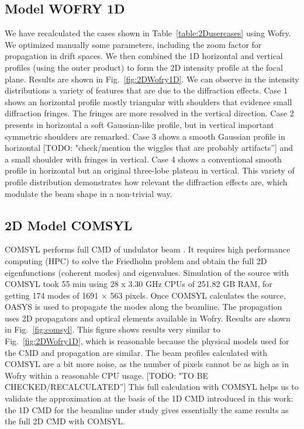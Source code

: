 \documentclass{iucr}              %
\newcommand{\todo}[1]{{\color{red}[TODO: "#1'']}}
\newcommand{\inred}[1]{{\color{red}#1}}
\begin{document}
\subsection{Model WOFRY 1D}
We have recalculated the cases shown in Table~\ref{table:2Dusercases} using Wofry. We optimized manually some parameters, including the zoom factor for propagation in drift spaces. We then combined the 1D horizontal and vertical profiles (using the outer product) to form the 2D intensity profile at the focal plane. Results are shown in Fig.~\ref{fig:2DWofry1D}. We can observe in the intensity distributions a variety of features that are due to the diffraction effects. Case 1 shows an horizontal profile mostly triangular with shoulders that evidence small diffraction fringes. The fringes are more resolved in the vertical direction. Case 2  presents in horizontal a soft Gaussian-like profile, but in vertical important symmetric shoulders are remarked. Case 3 shows a smooth Gaussian profile in horizontal \todo{check/mention the wiggles that are probably artifacts} and a small shoulder with fringes in vertical. Case 4 shows a conventional smooth profile in horizontal but an original three-lobe plateau in vertical. This variety of profile distribution demonstrates how relevant the diffraction effects are, which modulate the beam shape in a non-trivial way.  

\subsection{2D Model COMSYL}
COMSYL performs full CMD of undulator beam \cite{glass2017}. It requires high performance computing (HPC) to solve the Friedholm problem and obtain the full 2D eigenfunctions (coherent modes) and eigenvalues.
Simulation of the source with COMSYL took 55 min using  
28 x 3.30 GHz CPUs of 251.82 GB RAM, for getting 174 modes of 1691 $\times$ 563 pixels.
Once COMSYL calculates the source, OASYS is used to propagate the modes along the beamline.
The propagation uses 2D propagators and optical elements available in Wofry. Results are shown in Fig.~\ref{fig:comsyl}. This figure shows results very similar to Fig.~\ref{fig:2DWofry1D}, which is reasonable because the physical models used for the CMD and propagation are similar. \inred{The beam profiles calculated with COMSYL are a bit more noise, as the number of pixels cannot be as high as in Wofry within a reasonable CPU usage.} \todo{TO BE CHECKED/RECALCULATED} This full calculation with COMSYL helps us to validate the approximation at the basis of the 1D CMD introduced in this work: the 1D CMD for the beamline under study gives essentially the same results as the full 2D CMD with COMSYL.
\end{document}
